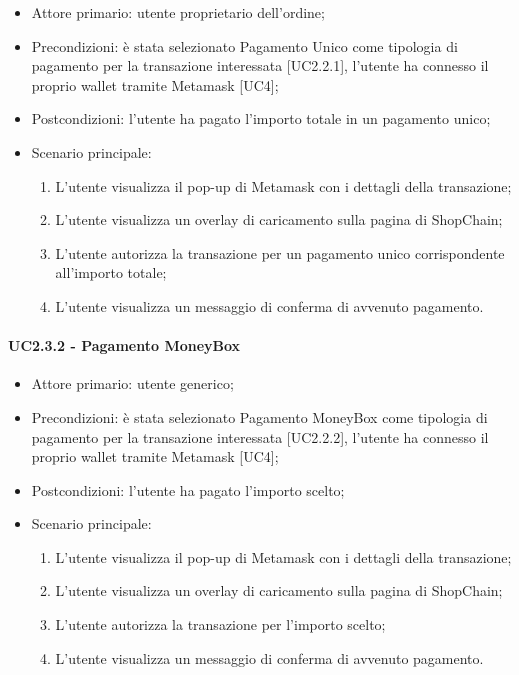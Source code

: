 \begin{itemize}
    \item Attore primario: utente proprietario dell'ordine;
    \item Precondizioni: è stata selezionato Pagamento Unico come tipologia di pagamento per la transazione interessata [UC2.2.1], 
            l'utente ha connesso il proprio wallet\glo{} tramite Metamask\glo{} [UC4];
    \item Postcondizioni: l'utente ha pagato l'importo totale in un pagamento unico;
    \item Scenario principale:
    \begin{enumerate}
        \item L'utente visualizza il pop-up di Metamask\glo{} con i dettagli della transazione;
        \item L'utente visualizza un overlay di caricamento sulla pagina di ShopChain;
        \item L'utente autorizza la transazione per un pagamento unico corrispondente all'importo totale;
        \item L'utente visualizza un messaggio di conferma di avvenuto pagamento.
    \end{enumerate}
\end{itemize}

\paragraph{UC2.3.2 - Pagamento MoneyBox}

\begin{itemize}
    \item Attore primario: utente generico;
    \item Precondizioni: è stata selezionato Pagamento MoneyBox\glo{} come tipologia di pagamento per la transazione interessata [UC2.2.2], 
            l'utente ha connesso il proprio wallet\glo{} tramite Metamask\glo{} [UC4];
    \item Postcondizioni: l'utente ha pagato l'importo scelto;
    \item Scenario principale:
    \begin{enumerate}
        \item L'utente visualizza il pop-up di Metamask\glo{} con i dettagli della transazione;
        \item L'utente visualizza un overlay di caricamento sulla pagina di ShopChain;
        \item L'utente autorizza la transazione per l'importo scelto;
        \item L'utente visualizza un messaggio di conferma di avvenuto pagamento.
    \end{enumerate}
\end{itemize}

